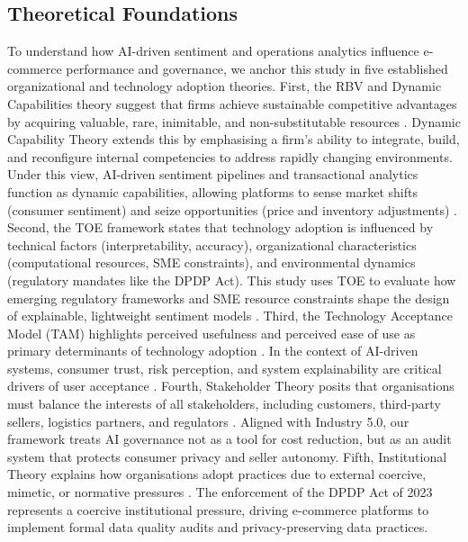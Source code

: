 \documentclass[authoryear,review,3p,times,12pt]{elsarticle}
\begin{document}
\subsection{Theoretical Foundations}
To understand how AI-driven sentiment and operations analytics influence e-commerce performance and governance, we anchor this study in five established organizational and technology adoption theories. First, the RBV and Dynamic Capabilities theory suggest that firms achieve sustainable competitive advantages by acquiring valuable, rare, inimitable, and non-substitutable resources \citep{barney1991firm}. Dynamic Capability Theory extends this by emphasising a firm's ability to integrate, build, and reconfigure internal competencies to address rapidly changing environments. Under this view, AI-driven sentiment pipelines and transactional analytics function as dynamic capabilities, allowing platforms to sense market shifts (consumer sentiment) and seize opportunities (price and inventory adjustments) \citep{RAHMAN2026100020, patgiri2026artificial, chen2022impact}. Second, the TOE framework \citep{tornatzky1990processes} states that technology adoption is influenced by technical factors (interpretability, accuracy), organizational characteristics (computational resources, SME constraints), and environmental dynamics (regulatory mandates like the DPDP Act). This study uses TOE to evaluate how emerging regulatory frameworks and SME resource constraints shape the design of explainable, lightweight sentiment models \citep{zhu2026ai}. Third, the Technology Acceptance Model (TAM) highlights perceived usefulness and perceived ease of use as primary determinants of technology adoption \citep{davis1989user}. In the context of AI-driven systems, consumer trust, risk perception, and system explainability are critical drivers of user acceptance \citep{patgiri2026artificial,zhu2026ai, phan2025ai_trust}. Fourth, Stakeholder Theory posits that organisations must balance the interests of all stakeholders, including customers, third-party sellers, logistics partners, and regulators \citep{MAHAJAN2023114104}. Aligned with Industry 5.0, our framework treats AI governance not as a tool for cost reduction, but as an audit system that protects consumer privacy and seller autonomy. Fifth, Institutional Theory explains how organisations adopt practices due to external coercive, mimetic, or normative pressures \citep{hirsch1975organizational}. The enforcement of the DPDP Act of 2023 represents a coercive institutional pressure, driving e-commerce platforms to implement formal data quality audits and privacy-preserving data practices.
\end{document}
